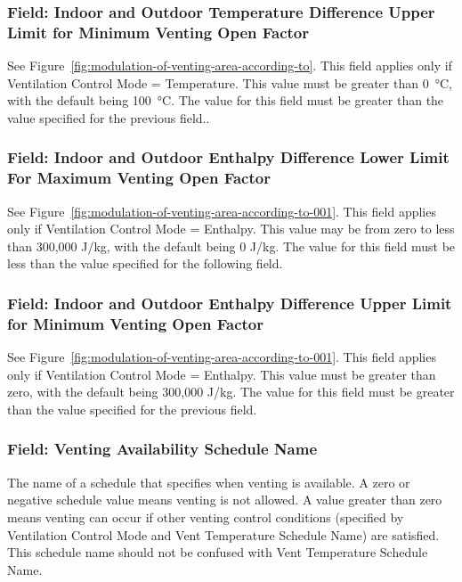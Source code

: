 \subsubsection{Field: Indoor and Outdoor Temperature Difference Upper Limit for Minimum Venting Open Factor}\label{field-indoor-and-outdoor-temperature-difference-upper-limit-for-minimum-venting-open-factor}

See Figure~\ref{fig:modulation-of-venting-area-according-to}. This field applies only if Ventilation Control Mode = Temperature. This value must be greater than \SI{0}{\celsius}, with the default being \SI{100}{\celsius}. The value for this field must be greater than the value specified for the previous field..

\subsubsection{Field: Indoor and Outdoor Enthalpy Difference Lower Limit For Maximum Venting Open Factor}\label{field-indoor-and-outdoor-enthalpy-difference-lower-limit-for-maximum-venting-open-factor}

See Figure~\ref{fig:modulation-of-venting-area-according-to-001}. This field applies only if Ventilation Control Mode = Enthalpy. This value may be from zero to less than 300,000 J/kg, with the default being 0 J/kg. The value for this field must be less than the value specified for the following field.

\subsubsection{Field: Indoor and Outdoor Enthalpy Difference Upper Limit for Minimum Venting Open Factor}\label{field-indoor-and-outdoor-enthalpy-difference-upper-limit-for-minimum-venting-open-factor}

See Figure~\ref{fig:modulation-of-venting-area-according-to-001}. This field applies only if Ventilation Control Mode = Enthalpy. This value must be greater than zero, with the default being 300,000 J/kg. The value for this field must be greater than the value specified for the previous field.

\subsubsection{Field: Venting Availability Schedule Name}\label{field-venting-availability-schedule-name}

The name of a schedule that specifies when venting is available. A zero or negative schedule value means venting is not allowed. A value greater than zero means venting can occur if other venting control conditions (specified by Ventilation Control Mode and Vent Temperature Schedule Name) are satisfied. This schedule name should not be confused with Vent Temperature Schedule Name.

